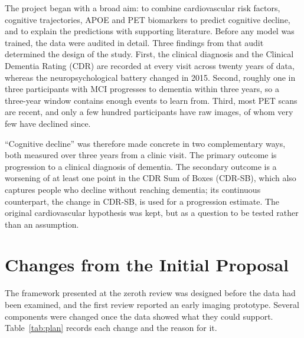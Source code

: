 The project began with a broad aim: to combine cardiovascular risk factors, cognitive trajectories, APOE and PET biomarkers to predict cognitive decline, and to explain the predictions with supporting literature. Before any model was trained, the data were audited in detail. Three findings from that audit determined the design of the study. First, the clinical diagnosis and the Clinical Dementia Rating (CDR) are recorded at every visit across twenty years of data, whereas the neuropsychological battery changed in 2015. Second, roughly one in three participants with MCI progresses to dementia within three years, so a three-year window contains enough events to learn from. Third, most PET scans are recent, and only a few hundred participants have raw images, of whom very few have declined since.

``Cognitive decline'' was therefore made concrete in two complementary ways, both measured over three years from a clinic visit. The primary outcome is progression to a clinical diagnosis of dementia. The secondary outcome is a worsening of at least one point in the CDR Sum of Boxes (CDR-SB), which also captures people who decline without reaching dementia; its continuous counterpart, the change in CDR-SB, is used for a progression estimate. The original cardiovascular hypothesis was kept, but as a question to be tested rather than an assumption.

\section{Changes from the Initial Proposal}

The framework presented at the zeroth review was designed before the data had been examined, and the first review reported an early imaging prototype. Several components were changed once the data showed what they could support. Table~\ref{tab:plan} records each change and the reason for it.

